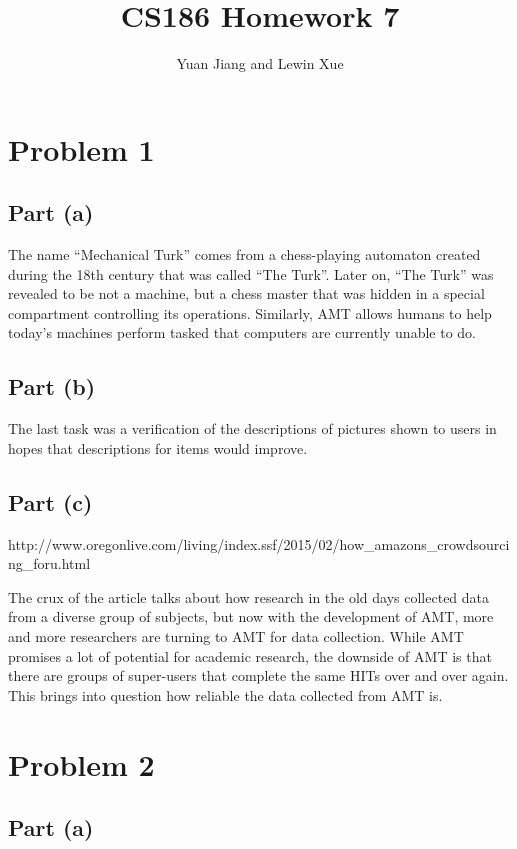 \documentclass[11pt]{article}
\title{CS186 Homework 7}
\author{Yuan Jiang and Lewin Xue}
\date{}                                           %
\begin{document}
\maketitle

\section*{Problem 1}

\subsection*{Part (a)}


The name ``Mechanical Turk'' comes from a chess-playing automaton created during the 18th century that was called ``The Turk''. Later on, ``The Turk'' was revealed to be not a machine, but a chess master that was hidden in a special compartment controlling its operations. Similarly, AMT allows humans to help today's machines perform tasked that computers are currently unable to do. 

\subsection*{Part (b)}

The last task was a verification of the descriptions of pictures shown to users in hopes that descriptions for items would improve.

\subsection*{Part (c)}


http://www.oregonlive.com/living/index.ssf/2015/02/how_amazons_crowdsourcing_foru.html

The crux of the article talks about how research in the old days collected data from a diverse group of subjects, but now with the development of AMT, more and more researchers are turning to AMT for data collection. While AMT promises a lot of potential for academic research, the downside of AMT is that there are groups of super-users that complete the same HITs over and over again. This brings into question how reliable the data collected from AMT is.

\section*{Problem 2}

\subsection*{Part (a)}
\end{document}
